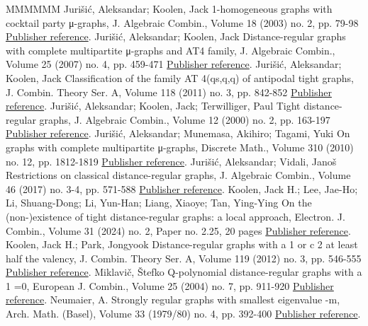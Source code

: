 \begin{thebibliography}{MMMMMM}
 Jurišić, Aleksandar; Koolen, Jack 1-homogeneous graphs with cocktail party μ-graphs, J. Algebraic Combin., Volume 18 (2003) no. 2, pp. 79-98 \href{https://alco.centre-mersenne.org/articles/10.5802/alco.454/#JK2003}{Publisher reference}.
 Jurišić, Aleksandar; Koolen, Jack Distance-regular graphs with complete multipartite μ-graphs and AT4 family, J. Algebraic Combin., Volume 25 (2007) no. 4, pp. 459-471 \href{https://alco.centre-mersenne.org/articles/10.5802/alco.454/#JK2007}{Publisher reference}.
 Jurišić, Aleksandar; Koolen, Jack Classification of the family  AT 4(qs,q,q) of antipodal tight graphs, J. Combin. Theory Ser. A, Volume 118 (2011) no. 3, pp. 842-852 \href{https://alco.centre-mersenne.org/articles/10.5802/alco.454/#JK2011}{Publisher reference}.
 Jurišić, Aleksandar; Koolen, Jack; Terwilliger, Paul Tight distance-regular graphs, J. Algebraic Combin., Volume 12 (2000) no. 2, pp. 163-197 \href{https://alco.centre-mersenne.org/articles/10.5802/alco.454/#JKT2000}{Publisher reference}.
 Jurišić, Aleksandar; Munemasa, Akihiro; Tagami, Yuki On graphs with complete multipartite μ-graphs, Discrete Math., Volume 310 (2010) no. 12, pp. 1812-1819 \href{https://alco.centre-mersenne.org/articles/10.5802/alco.454/#JMT2010}{Publisher reference}.
 Jurišić, Aleksandar; Vidali, Janoš Restrictions on classical distance-regular graphs, J. Algebraic Combin., Volume 46 (2017) no. 3-4, pp. 571-588 \href{https://alco.centre-mersenne.org/articles/10.5802/alco.454/#JV2017}{Publisher reference}.
 Koolen, Jack H.; Lee, Jae-Ho; Li, Shuang-Dong; Li, Yun-Han; Liang, Xiaoye; Tan, Ying-Ying On the (non-)existence of tight distance-regular graphs: a local approach, Electron. J. Combin., Volume 31 (2024) no. 2, Paper no. 2.25, 20 pages \href{https://alco.centre-mersenne.org/articles/10.5802/alco.454/#KLLLLT2023+}{Publisher reference}.
 Koolen, Jack H.; Park, Jongyook Distance-regular graphs with a 1  or c 2  at least half the valency, J. Combin. Theory Ser. A, Volume 119 (2012) no. 3, pp. 546-555 \href{https://alco.centre-mersenne.org/articles/10.5802/alco.454/#KP2012}{Publisher reference}.
 Miklavič, Štefko Q-polynomial distance-regular graphs with a 1 =0, European J. Combin., Volume 25 (2004) no. 7, pp. 911-920 \href{https://alco.centre-mersenne.org/articles/10.5802/alco.454/#Miklavic2004}{Publisher reference}.
 Neumaier, A. Strongly regular graphs with smallest eigenvalue -m, Arch. Math. (Basel), Volume 33 (1979/80) no. 4, pp. 392-400 \href{https://alco.centre-mersenne.org/articles/10.5802/alco.454/#Neumaier.1979}{Publisher reference}.

\end{thebibliography}
